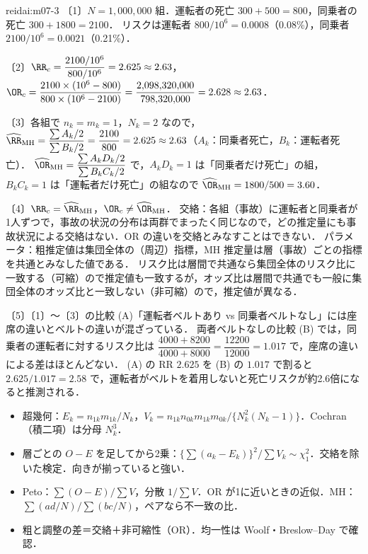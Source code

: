 \begin{kaitou}{reidai:m07-3}
〔1〕$N=1{,}000{,}000$ 組．運転者の死亡 $300+500=800$，同乗者の死亡 $300+1800=2100$．
リスクは運転者 $800/10^6=0.0008$（0.08\%），同乗者 $2100/10^6=0.0021$（0.21\%）．

〔2〕$\RR_c=\dfrac{2100/10^6}{800/10^6}=2.625\approx2.63$，\quad
$\OR_c=\dfrac{2100\times(10^6-800)}{800\times(10^6-2100)}=\dfrac{2{,}098{,}320{,}000}{798{,}320{,}000}=2.628\approx2.63$．

〔3〕各組で $n_k=m_k=1$，$N_k=2$ なので，$\widehat\RR_{\mathrm{MH}}=\dfrac{\sum A_k/2}{\sum B_k/2}=\dfrac{2100}{800}=2.625\approx2.63$（$A_k$：同乗者死亡，$B_k$：運転者死亡）．
$\widehat\OR_{\mathrm{MH}}=\dfrac{\sum A_kD_k/2}{\sum B_kC_k/2}$ で，$A_kD_k=1$ は「同乗者だけ死亡」の組，$B_kC_k=1$ は「運転者だけ死亡」の組なので
$\widehat\OR_{\mathrm{MH}}=1800/500=3.60$．

〔4〕$\RR_c=\widehat\RR_{\mathrm{MH}}$，$\OR_c\ne\widehat\OR_{\mathrm{MH}}$．
交絡：各組（事故）に運転者と同乗者が1人ずつで，事故の状況の分布は両群でまったく同じなので，どの推定量にも事故状況による交絡はない．OR の違いを交絡とみなすことはできない．
パラメータ：粗推定値は集団全体の（周辺）指標，MH 推定量は層（事故）ごとの指標を共通とみなした値である．
リスク比は層間で共通なら集団全体のリスク比に一致する（可縮）ので推定値も一致するが，オッズ比は層間で共通でも一般に集団全体のオッズ比と一致しない（非可縮）ので，推定値が異なる．

〔5〕〔1〕〜〔3〕の比較 (A)「運転者ベルトあり vs 同乗者ベルトなし」には座席の違いとベルトの違いが混ざっている．
両者ベルトなしの比較 (B) では，同乗者の運転者に対するリスク比は $\dfrac{4000+8200}{4000+8000}=\dfrac{12200}{12000}=1.017$ で，座席の違いによる差はほとんどない．
(A) の RR $2.625$ を (B) の $1.017$ で割ると $2.625/1.017=2.58$ で，運転者がベルトを着用しないと死亡リスクが約2.6倍になると推測される．
\end{kaitou}

\begin{summarybox}
\begin{itemize}
\item 超幾何：$E_k=n_{1k}m_{1k}/N_k$，$V_k=n_{1k}n_{0k}m_{1k}m_{0k}/\{N_k^2(N_k-1)\}$．Cochran（積二項）は分母 $N_k^3$．
\item 層ごとの $O-E$ を足してから2乗：$\{\sum(a_k-E_k)\}^2/\sum V_k\sim\chi^2_1$．交絡を除いた検定．向きが揃っていると強い．
\item Peto：$\sum(O-E)/\sum V$，分散 $1/\sum V$．OR が1に近いときの近似．MH：$\sum(ad/N)/\sum(bc/N)$，ペアなら不一致の比．
\item 粗と調整の差＝交絡＋非可縮性（OR）．均一性は Woolf・Breslow--Day で確認．
\end{itemize}
\end{summarybox}
